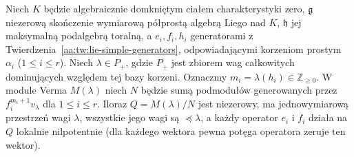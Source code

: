 \begin{lemat}
\label{aa:lem:verma-integrable}
Niech $K$ będzie algebraicznie domkniętym ciałem charakterystyki zero, $\mathfrak g$ niezerową skończenie wymiarową półprostą algebrą Liego nad $K$, $\mathfrak h$ jej maksymalną podalgebrą toralną, a $e_i,f_i,h_i$ generatorami z Twierdzenia~\ref{aa:tw:lie-simple-generators}, odpowiadającymi korzeniom prostym $\alpha_i$ ($1\le i\le r$). Niech $\lambda\in P_+$, gdzie $P_+$ jest zbiorem wag całkowitych dominujących względem tej bazy korzeni. Oznaczmy $m_i=\lambda(h_i)\in\mathbb Z_{\ge0}$. W module Verma $M(\lambda)$ niech $N$ będzie sumą podmodułów generowanych przez $f_i^{m_i+1}v_\lambda$ dla $1\le i\le r$. Iloraz $Q=M(\lambda)/N$ jest niezerowy, ma jednowymiarową przestrzeń wagi $\lambda$, wszystkie jego wagi są $\preceq\lambda$, a każdy operator $e_i$ i $f_i$ działa na $Q$ lokalnie nilpotentnie (dla każdego wektora pewna potęga operatora zeruje ten wektor).
\end{lemat}
